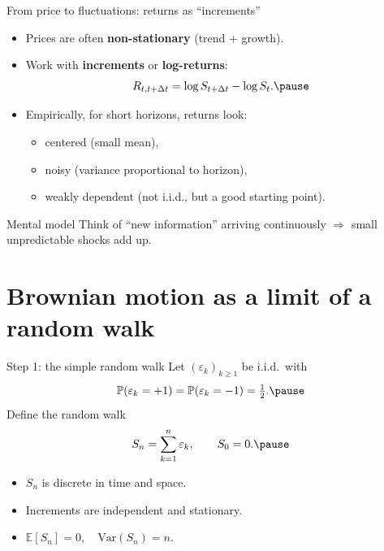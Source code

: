 \documentclass[10pt,aspectratio=169]{beamer}
\begin{document}
\begin{frame}{From price to fluctuations: returns as ``increments''}
\begin{itemize}
  \item Prices are often \textbf{non-stationary} (trend + growth).\pause
  \item Work with \textbf{increments} or \textbf{log-returns}:
  \[
    R_{t,t+\Delta t}=\log S_{t+\Delta t}-\log S_t.\pause
  \]
  \item Empirically, for short horizons, returns look:
  \begin{itemize}
    \item centered (small mean),\pause
    \item noisy (variance proportional to horizon),\pause
    \item weakly dependent (not i.i.d., but a good starting point).\pause
  \end{itemize}
\end{itemize}

\medskip
\begin{exampleblock}{Mental model}
Think of ``new information'' arriving continuously $\Rightarrow$ small unpredictable shocks add up.
\end{exampleblock}
\end{frame}


\section{Brownian motion as a limit of a random walk}

\begin{frame}{Step 1: the simple random walk}
Let $(\varepsilon_k)_{k\ge1}$ be i.i.d.\ with
\[
\mathbb{P}(\varepsilon_k=+1)=\mathbb{P}(\varepsilon_k=-1)=\tfrac12.\pause
\]
Define the random walk
\[
S_n=\sum_{k=1}^n \varepsilon_k,\qquad S_0=0.\pause
\]

\begin{itemize}
  \item $S_n$ is discrete in time and space.\pause
  \item Increments are independent and stationary.\pause
  \item $\mathbb{E}[S_n]=0,\quad \mathrm{Var}(S_n)=n$.
\end{itemize}
\end{frame}
\end{document}
